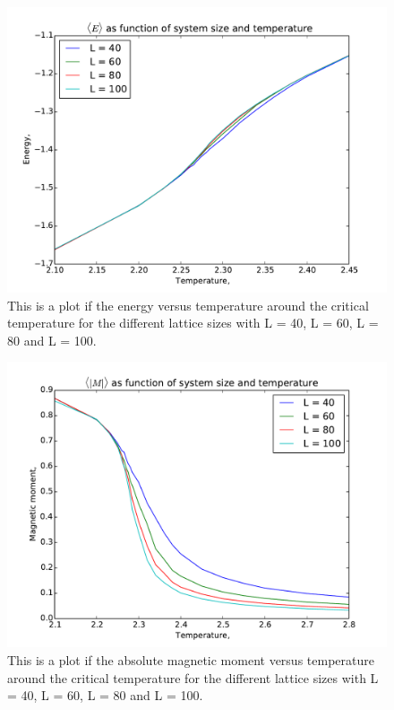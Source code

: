 \begin{figure}[H]
\includegraphics[width=\linewidth]{../results/4e/4e_energy}\caption{This is a plot if the energy versus temperature around the critical temperature for the different lattice sizes with L = 40, L = 60, L = 80 and L = 100.}\label{fig:4e_energy}
\end{figure}

\begin{figure}[H]
\includegraphics[width=\linewidth]{../results/4e/4e_mag}\caption{This is a plot if the absolute magnetic moment versus temperature around the critical temperature for the different lattice sizes with L = 40, L = 60, L = 80 and L = 100.}\label{fig:4e_magnetic}
\end{figure}


